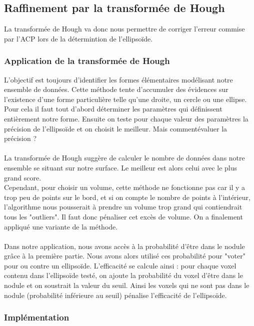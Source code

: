 \documentclass{article}
\begin{document}
\subsection{Raffinement par la transformée de Hough}

La transformée de Hough va donc nous permettre de corriger l'erreur commise par l'ACP lors de la détermintion de l'ellipsoïde.

\subsubsection{Application de la transformée de Hough}

L'objectif est toujours d'identifier les formes élémentaires modélisant notre ensemble de données. Cette méthode tente d'accumuler des évidences sur l'existence d'une forme particulière telle qu'une droite, un cercle ou  une ellipse. Pour cela il faut tout d'abord déterminer les paramètres qui définissent entièrement notre forme. Ensuite on teste pour chaque valeur des paramètres la précision de l'ellipsoïde et on choisit le meilleur. Mais commentévaluer la précision ?\\\\
La transformée de Hough suggère de calculer le nombre de données dans notre ensemble se situant sur notre surface. Le meilleur est alors celui avec le plus grand score.\\
Cependant, pour choisir un volume, cette méthode ne fonctionne pas car il y a trop peu de points sur le bord, et si on compte le nombre de points à l'intérieur, l'algorithme nous pousserait à prendre un volume trop grand qui contiendrait tous les "outliers". Il faut donc pénaliser cet excès de volume. On a finalement appliqué une variante de la méthode.\\\\
Dans notre application, nous avons accès à la probabilité d'être dans le nodule grâce à la première partie. Nous avons alors utilisé ces probabilité pour "voter" pour ou contre un ellipsoïde. L'efficacité se calcule ainsi : pour chaque voxel contenu dans l'ellipsoïde testé, on ajoute la probabilité du voxel d'être dans le nodule et on soustrait la valeur du seuil. Ainsi les voxels qui ne sont pas dans le nodule (probabilité inférieure au seuil) pénalise l'efficacité de l'ellipsoïde.

\subsubsection{Implémentation}
\end{document}
